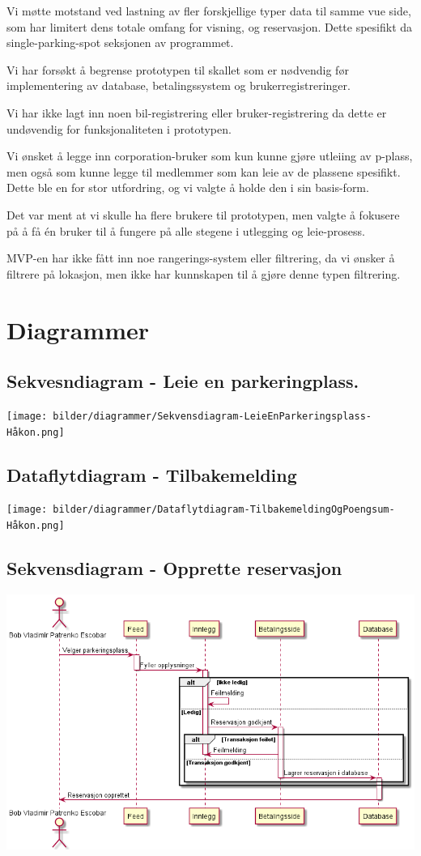 \documentclass[12pt]{article}
\begin{document}
    Vi møtte motstand ved lastning av fler forskjellige typer data til samme vue side, som har limitert dens totale omfang for visning, og reservasjon. Dette spesifikt da single-parking-spot seksjonen av programmet.
    
    Vi har forsøkt å begrense prototypen til skallet som er nødvendig før implementering av database, betalingssystem og brukerregistreringer.
    
    Vi har ikke lagt inn noen bil-registrering eller bruker-registrering da dette er undøvendig for funksjonaliteten i prototypen. 
    
    Vi ønsket å legge inn corporation-bruker som kun kunne gjøre utleiing av p-plass, men også som kunne legge til medlemmer som kan leie av de plassene spesifikt. Dette ble en for stor utfordring, og vi valgte å holde den i sin basis-form.
    
    Det var ment at vi skulle ha flere brukere til prototypen, men valgte å fokusere på å få én bruker til å fungere på alle stegene i utlegging og leie-prosess.
    
    MVP-en har ikke fått inn noe rangerings-system eller filtrering, da vi ønsker å filtrere på lokasjon, men ikke har kunnskapen til å gjøre denne typen filtrering.

\section{Diagrammer}
    \subsection{Sekvesndiagram - Leie en parkeringplass.}
    \texttt{[image: bilder/diagrammer/Sekvensdiagram-LeieEnParkeringsplass-Håkon.png]}

    \subsection{Dataflytdiagram - Tilbakemelding}
    \texttt{[image: bilder/diagrammer/Dataflytdiagram-TilbakemeldingOgPoengsum-Håkon.png]}

    \subsection{Sekvensdiagram - Opprette reservasjon}
    \includegraphics[max width=\textwidth]{bilder/diagrammer/opprette reservasjon_sekvensdiagram.png}
\end{document}
